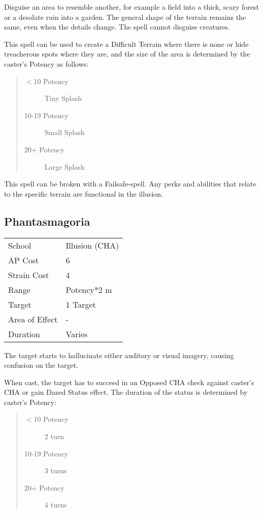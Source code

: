 \documentclass[11pt,a4paper,twocolumn]{book}
\begin{document}
\medskip

Disguise an area to resemble another, for example a field into a thick, scary forest or a desolate ruin into a garden. The general shape of the terrain remains the same, even when the details change. The spell cannot disguise creatures.

This spell can be used to create a Difficult Terrain where there is none or hide treacherous spots where they are, and the size of the area is determined by the caster's Potency as follows:

\begin{quote}
	\begin{description}
		\item[$<$10 Potency] 	Tiny Splash
		\item[10-19 Potency] 	Small Splash
		\item[20+ Potency] 	    Large Splash
	\end{description}
\end{quote}

This spell can be broken with a Failsafe-spell. Any perks and abilities that relate to the specific terrain are functional in the illusion.


\subsection*{Phantasmagoria}
{
	\begin{tabu} to 75mm{| X[l,4] | X[l,7] |}
		\hline
		School 			& Illusion (CHA) 		\\
		AP Cost	      	& 6 					\\
		Strain Cost     & 4 					\\
		Range     		& Potency*2	m			\\
		Target      	& 1 Target				\\
		Area of Effect  & -  	 				\\
		Duration     	& Varies				\\ \hline
	\end{tabu}
	
}

\medskip

The target starts to hallucinate either auditory or visual imagery, causing confusion on the target.

When cast, the target has to succeed in an Opposed CHA check against caster's CHA or gain Dazed Status effect. The duration of the status is determined by caster's Potency:
\begin{quote}
	\begin{description}
		\item[$<$10 Potency] 	2 turn
		\item[10-19 Potency] 	3 turns
		\item[20+ Potency] 	    4 turns
	\end{description}	
\end{quote}
\end{document}
